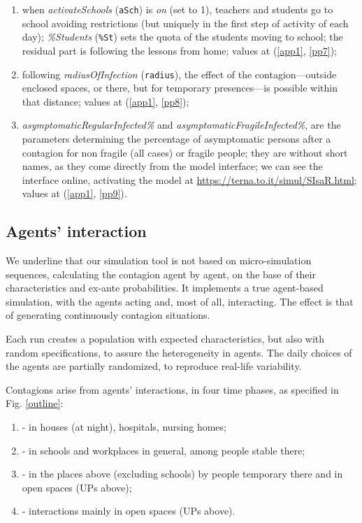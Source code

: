 \documentclass[graybox]{svmult}
\begin{document}
\begin{enumerate}[label=\roman*]
\item \label{p7} when \emph{activateSchools} (\verb|aSch|) is \emph{on} (set to 1), teachers and students go to school avoiding restrictions (but uniquely in the first step of activity of each day); \emph{\%Students} (\verb|%St|) sets the quota of the students moving to school; the residual part is following the lessons from home; values at (\ref{app1}, \ref{pp7});

\item \label{p8} following \emph{radiusOfInfection} (\verb|radius|), the effect of the contagion---outside enclosed spaces, or there, but for temporary presences---is possible within that distance; values at (\ref{app1}, \ref{pp8});

\item \label{p9} \emph{asymptomaticRegularInfected\%} and \emph{asymptomaticFragileInfected\%}, are the parameters determining the percentage of asymptomatic persons after a contagion for non fragile (all cases) or fragile people;
they are without short names, as they come directly from the model interface; we can see the interface online, activating the model at \href{https://terna.to.it/simul/SIsaR.html}{https://terna.to.it/simul/SIsaR.html}; values at (\ref{app1}, \ref{pp9}).

\end{enumerate}

\subsection{Agents' interaction}
\label{inter}

We underline that our simulation tool is not based on micro-simulation sequences, calculating the contagion agent by agent, on the base of their characteristics and ex-ante probabilities. It implements a true agent-based simulation, with the agents acting and, most of all, interacting. The effect is that of generating continuously contagion situations.

Each run creates a population with expected characteristics, but also with random specifications, to assure the heterogeneity in agents. The daily choices of the agents are partially randomized, to reproduce real-life variability.

Contagions arise from agents' interactions, in four time phases, as specified in Fig. \ref{outline}:

\begin{enumerate}[label=\Alph*]

\item - in houses (at night), hospitals, nursing homes;

\item - in schools and workplaces in general, among people stable there;

\item - in the places above (excluding schools) by people temporary there and in open spaces (UPs above);

\item - interactions mainly in open spaces (UPs above).

\end{enumerate}
\end{document}
